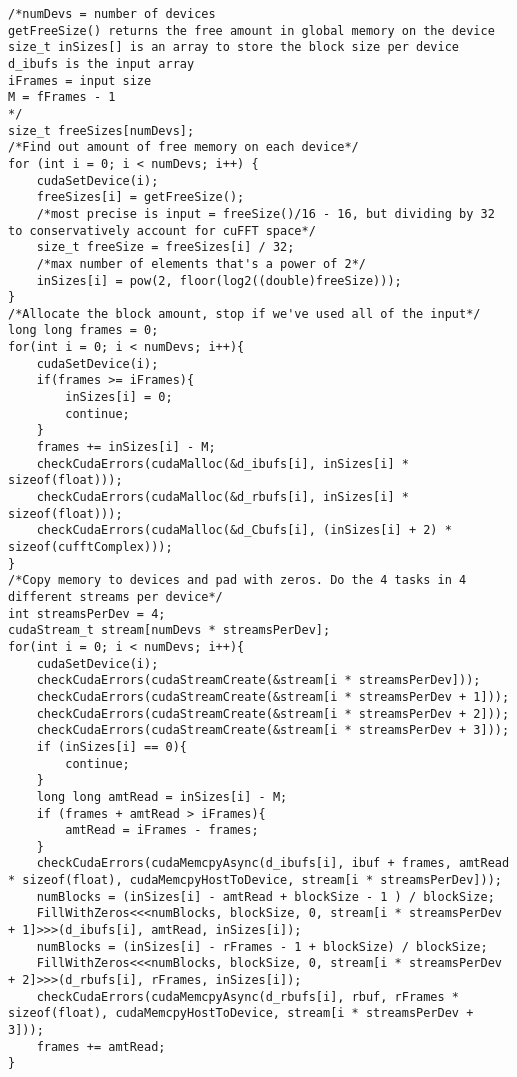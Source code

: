 \begin{verbatim}
/*numDevs = number of devices
getFreeSize() returns the free amount in global memory on the device
size_t inSizes[] is an array to store the block size per device
d_ibufs is the input array
iFrames = input size
M = fFrames - 1
*/
size_t freeSizes[numDevs];
/*Find out amount of free memory on each device*/
for (int i = 0; i < numDevs; i++) {
    cudaSetDevice(i);
    freeSizes[i] = getFreeSize();
    /*most precise is input = freeSize()/16 - 16, but dividing by 32 to conservatively account for cuFFT space*/
    size_t freeSize = freeSizes[i] / 32;
    /*max number of elements that's a power of 2*/
    inSizes[i] = pow(2, floor(log2((double)freeSize)));
}
/*Allocate the block amount, stop if we've used all of the input*/
long long frames = 0;
for(int i = 0; i < numDevs; i++){
    cudaSetDevice(i);
    if(frames >= iFrames){
        inSizes[i] = 0;
        continue;
    }
    frames += inSizes[i] - M;
    checkCudaErrors(cudaMalloc(&d_ibufs[i], inSizes[i] * sizeof(float)));
    checkCudaErrors(cudaMalloc(&d_rbufs[i], inSizes[i] * sizeof(float)));
    checkCudaErrors(cudaMalloc(&d_Cbufs[i], (inSizes[i] + 2) * sizeof(cufftComplex)));
}
/*Copy memory to devices and pad with zeros. Do the 4 tasks in 4 different streams per device*/
int streamsPerDev = 4;
cudaStream_t stream[numDevs * streamsPerDev];
for(int i = 0; i < numDevs; i++){
    cudaSetDevice(i);
    checkCudaErrors(cudaStreamCreate(&stream[i * streamsPerDev]));
    checkCudaErrors(cudaStreamCreate(&stream[i * streamsPerDev + 1]));
    checkCudaErrors(cudaStreamCreate(&stream[i * streamsPerDev + 2]));
    checkCudaErrors(cudaStreamCreate(&stream[i * streamsPerDev + 3]));
    if (inSizes[i] == 0){
        continue;
    }
    long long amtRead = inSizes[i] - M;
    if (frames + amtRead > iFrames){
        amtRead = iFrames - frames;
    }
    checkCudaErrors(cudaMemcpyAsync(d_ibufs[i], ibuf + frames, amtRead * sizeof(float), cudaMemcpyHostToDevice, stream[i * streamsPerDev]));
    numBlocks = (inSizes[i] - amtRead + blockSize - 1 ) / blockSize;
    FillWithZeros<<<numBlocks, blockSize, 0, stream[i * streamsPerDev + 1]>>>(d_ibufs[i], amtRead, inSizes[i]);
    numBlocks = (inSizes[i] - rFrames - 1 + blockSize) / blockSize;
    FillWithZeros<<<numBlocks, blockSize, 0, stream[i * streamsPerDev + 2]>>>(d_rbufs[i], rFrames, inSizes[i]);
    checkCudaErrors(cudaMemcpyAsync(d_rbufs[i], rbuf, rFrames * sizeof(float), cudaMemcpyHostToDevice, stream[i * streamsPerDev + 3]));
    frames += amtRead;
}
\end{verbatim}

